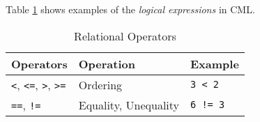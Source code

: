 Table \ref{tab:relational-expr-examples} shows
examples of the \emph{logical expressions} in CML.

\begin{table}[H]
\centering
\begin{tabular}
{ l l l }
\hline
Operators & Operation & Example \\
\hline
\verb!<!, \verb!<=!, \verb!>!, \verb!>=! & Ordering & \verb!3 < 2! \\
\verb!==!, \verb|!=| & Equality, Unequality & \verb|6 != 3|
\end{tabular}
\caption{Relational Operators}
\label{tab:relational-expr-examples}
\end{table}
